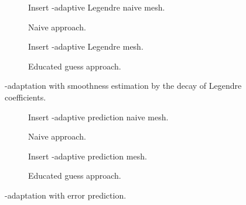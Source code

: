 \begin{figure}
\begin{subfigure}{.49\textwidth}
  \centering
  Insert \hp-adaptive Legendre naive mesh.
  \caption{Naive approach.}
\end{subfigure}
\begin{subfigure}{.49\textwidth}
  \centering
  Insert \hp-adaptive Legendre mesh.
  \caption{Educated guess approach.}
\end{subfigure}
\caption{\hp-adaptation with smoothness estimation by the decay of Legendre coefficients.}
\label{fig:meshlegendre}
\end{figure}

\begin{figure}
\begin{subfigure}{.49\textwidth}
  \centering
  Insert \hp-adaptive prediction naive mesh.
  \caption{Naive approach.}
\end{subfigure}
\begin{subfigure}{.49\textwidth}
  \centering
  Insert \hp-adaptive prediction mesh.
  \caption{Educated guess approach.}
\end{subfigure}
\caption{\hp-adaptation with error prediction.}
\label{fig:meshprediction}
\end{figure}
